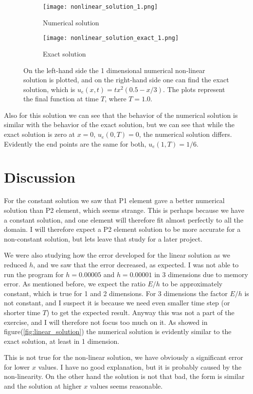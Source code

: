 \documentclass[norsk,a4paper,12pt]{article}
\begin{document}
\begin{figure}[H]
\centering
\begin{subfigure}{.6\textwidth}
  \centering
  \texttt{[image: nonlinear\_solution\_1.png]}
  \caption{Numerical solution}
  \label{fig:numerical_nonlinear_solution}
\end{subfigure}%
\begin{subfigure}{.6\textwidth}
  \centering
  \texttt{[image: nonlinear\_solution\_exact\_1.png]}
  \caption{Exact solution}
  \label{fig:exact_nonlinear_solution}
\end{subfigure}
\caption{On the left-hand side the 1 dimensional numerical non-linear solution is plotted, and on the right-hand side one can find the exact solution, which is $u_e(x, t)=tx^2(0.5 - x/3)$. The plots represent the final function at time $T$, where $T=1.0$.}
\label{fig:nonlinear_solution}
\end{figure}
Also for this solution we can see that the behavior of the numerical solution is similar with the behavior of the exact solution, but we can see that while the exact solution is zero at $x=0$, $u_e(0, T) = 0$, the numerical solution differs. Evidently the end points are the same for both, $u_e(1,T)=1/6$.

\section{Discussion}
For the constant solution we saw that P1 element gave a better numerical solution than P2 element, which seems strange. This is perhaps because we have a constant solution, and one element will therefore fit almost perfectly to all the domain. I will therefore expect a P2 element solution to be more accurate for a non-constant solution, but lets leave that study for a later project. 

We were also studying how the error developed for the linear solution as we reduced $h$, and we saw that the error decreased, as expected. I was not able to run the program for $h=0.00005$ and $h=0.00001$ in 3 dimensions due to memory error. As mentioned before, we expect the ratio $E/h$ to be approximately constant, which is true for 1 and 2 dimensions. For 3 dimensions the factor $E/h$ is not constant, and I suspect it is because we need even smaller time step (or shorter time $T$) to get the expected result. Anyway this was not a part of the exercise, and I will therefore not focus too much on it. As showed in figure(\ref{fig:linear_solution}) the numerical solution is evidently similar to the exact solution, at least in 1 dimension. 

This is not true for the non-linear solution, we have obviously a significant error for lower $x$ values. I have no good explanation, but it is probably caused by the non-linearity. On the other hand the solution is not that bad, the form is similar and the solution at higher $x$ values seems reasonable.
\end{document}
